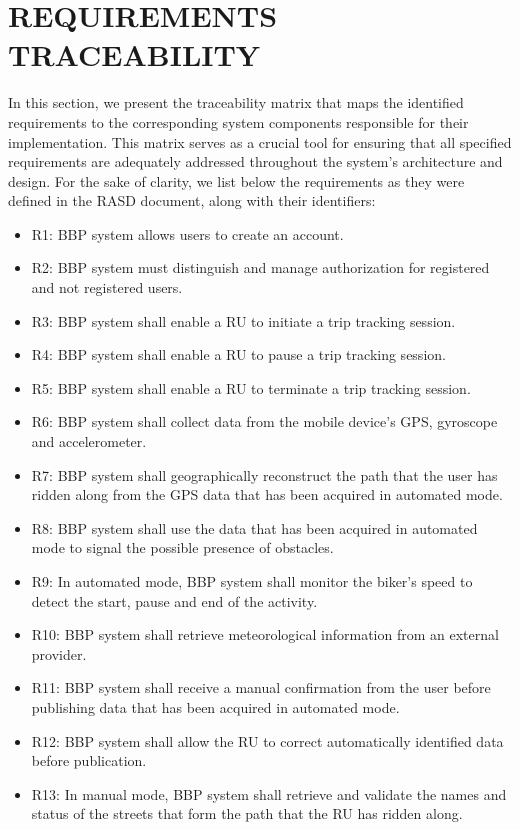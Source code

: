 \section{REQUIREMENTS TRACEABILITY}
In this section, we present the traceability matrix that maps the identified requirements to the corresponding system components responsible for their implementation. This matrix serves as a crucial tool for ensuring that all specified requirements are adequately addressed throughout the system's architecture and design.
For the sake of clarity, we list below the requirements as they were defined in the RASD document, along with their identifiers:
\begin{itemize}
    \item R1: BBP system allows users to create an account.
    \item R2: BBP system must distinguish and manage authorization for registered and not registered users.
    \item R3: BBP system shall enable a RU to initiate a trip tracking session.
    \item R4: BBP system shall enable a RU to pause a trip tracking session.
    \item R5: BBP system shall enable a RU to terminate a trip tracking session. 
    \item R6: BBP system shall collect data from the mobile device’s GPS, gyroscope and accelerometer.
    \item R7: BBP system shall geographically reconstruct the path that the user has ridden along from the GPS data that has been acquired in automated mode.
    \item R8: BBP system shall use the data that has been acquired in automated mode to signal the possible presence of obstacles.
    \item R9: In automated mode, BBP system shall monitor the biker’s speed to detect the start, pause and end of the activity.
    \item R10: BBP system shall retrieve meteorological information from an external provider.
    \item R11: BBP system shall receive a manual confirmation from the user before publishing data that has been acquired in automated mode.
    \item R12: BBP system shall allow the RU to correct automatically identified data before publication.
    \item R13: In manual mode, BBP system shall retrieve and validate the names and status of the streets that form the path that the RU has ridden along.

\end{itemize}
